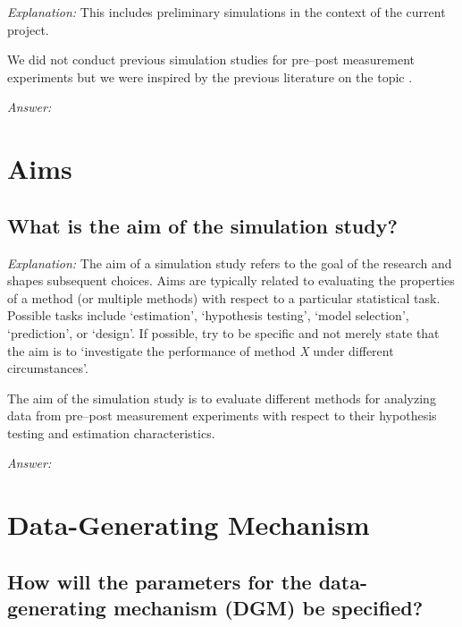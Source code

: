 \documentclass[12pt]{article}
\begin{document}
\textit{Explanation:} This includes preliminary simulations in the context of the current project.

\begin{examplebox}
    We did not conduct previous simulation studies for pre--post measurement experiments but we were inspired by the previous literature on the topic \parencite{vickers2001use, senn2006change, van2013ancova, clifton2019correlation, ludtke2023ancova}.
\end{examplebox}

\textit{Answer:}

\section{Aims}
\subsection{What is the aim of the simulation study?}

\textit{Explanation:} The aim of a simulation study refers to the goal of the research and shapes subsequent choices. Aims are typically related to evaluating the properties of a method (or multiple methods) with respect to a particular statistical task. Possible tasks include `estimation', `hypothesis testing', `model selection', `prediction', or `design'. If possible, try to be specific and not merely state that the aim is to `investigate the performance of method \textit{X} under different circumstances'.

\begin{examplebox}
The aim of the simulation study is to evaluate different methods for analyzing data from pre--post measurement experiments with respect to their hypothesis testing and estimation characteristics.
\end{examplebox}

\textit{Answer:}


\section{Data-Generating Mechanism}
\subsection{How will the parameters for the data-generating mechanism (DGM) be specified?}
\end{document}
